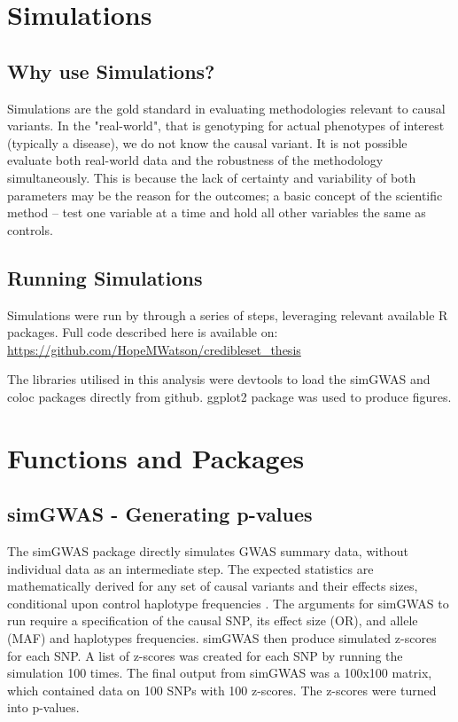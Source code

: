 \section{Simulations}
\subsection{Why use Simulations?}
Simulations are the gold standard in evaluating methodologies relevant to causal variants. In the "real-world", that is genotyping for actual phenotypes of interest (typically a disease), we do not know the causal variant. It is not possible evaluate both real-world data and the robustness of the methodology simultaneously. This is because the lack of certainty and variability of both parameters may be the reason for the outcomes; a basic concept of the scientific method -- test one variable at a time and hold all other variables the same as controls. 

\subsection{Running Simulations}

Simulations were run by through a series of steps, leveraging relevant available R packages. Full code described here is available on: \url{https://github.com/HopeMWatson/credibleset_thesis}

The libraries utilised in this analysis were devtools to load the simGWAS and coloc packages directly from github. ggplot2 package was used to produce figures. 

\section{Functions and Packages}
\subsection{simGWAS - Generating p-values}
The simGWAS package directly simulates GWAS summary data, without individual data as an intermediate step. The expected statistics are mathematically derived for any set of causal variants and their effects sizes, conditional upon control haplotype frequencies \cite{Fortune2018}. The arguments for simGWAS to run require a specification of the causal SNP, its effect size (OR), and allele (MAF) and haplotypes frequencies. simGWAS then produce simulated z-scores for each SNP. A list of z-scores was created for each SNP by running the simulation 100 times. The final output from simGWAS was a 100x100 matrix, which contained data on 100 SNPs with 100 z-scores. The z-scores were turned into p-values. 

